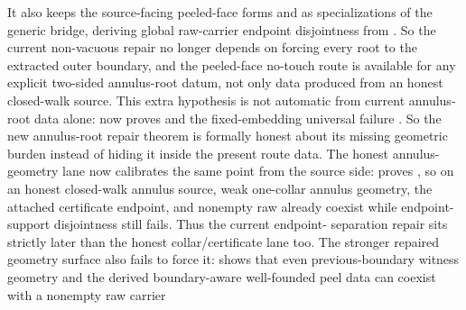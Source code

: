 \documentclass[11pt]{article}
\begin{document}
\begin{itemize}
It also keeps the source-facing peeled-face forms
and
as specializations of the generic bridge, deriving global raw-carrier endpoint
disjointness from
.
So the current non-vacuous repair no longer depends on forcing every root to
the extracted outer boundary, and the peeled-face no-touch route is available
for any explicit two-sided annulus-root datum, not only data produced from an
honest closed-walk source.
This extra hypothesis is not automatic from current annulus-root data alone:
 now proves
and the fixed-embedding universal failure
.
So the new annulus-root repair theorem is formally honest about its missing
geometric burden instead of hiding it inside the present route data.
The honest annulus-geometry lane now calibrates the same point from the source
side: 
proves
,
so on  an honest closed-walk annulus
source, weak one-collar annulus geometry, the attached certificate endpoint,
and nonempty raw  already coexist while
endpoint-support disjointness still fails.  Thus the current endpoint-
separation repair sits strictly later than the honest collar/certificate lane
too.  The stronger repaired geometry surface also fails to force it:
shows that even previous-boundary witness geometry and the derived
boundary-aware well-founded peel data can coexist with a nonempty raw carrier

\end{itemize}
\end{document}
